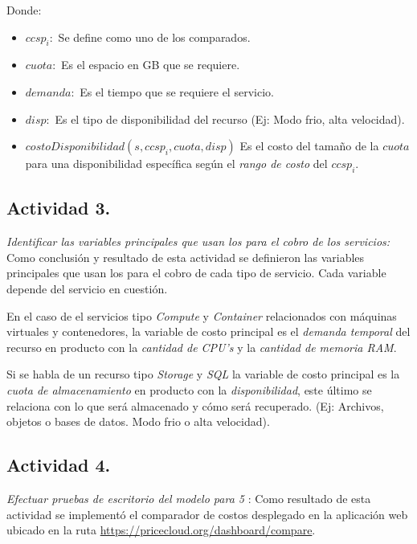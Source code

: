Donde:
\begin{itemize}
    \item $ccsp_i:$ Se define como uno de los  comparados.
    \item $cuota:$ Es el espacio en GB que se requiere.
    \item $demanda:$ Es el tiempo que se requiere el servicio.
    \item $disp:$ Es el tipo de disponibilidad del recurso (Ej: Modo frio, alta velocidad).
    \item $costoDisponibilidad(s,ccsp_i,cuota,disp)$ Es el costo del tamaño de la $cuota$ para una disponibilidad específica según el \emph{rango de costo} del $ccsp_i$.
\end{itemize}

\subsection{Actividad 3.}
\emph{Identificar las variables principales que usan los  para el cobro de los servicios:}
\newline\newline
Como conclusión y resultado de esta actividad se definieron las variables principales que usan los  para el cobro de cada tipo de servicio. Cada variable depende del servicio en cuestión.
\newline

En el caso de el servicios tipo \emph{Compute} y \emph{Container} relacionados con máquinas virtuales y contenedores, la variable de costo principal es el \emph{demanda temporal} del recurso en producto con la \emph{cantidad de CPU's} y la \emph{cantidad de memoria RAM}.
\newline

Si se habla de un recurso tipo \emph{Storage} y \emph{SQL} la variable de costo principal es la \emph{cuota de almacenamiento} en producto con la \emph{disponibilidad}, este último se relaciona con lo que será almacenado y cómo será recuperado. (Ej: Archivos, objetos o bases de datos. Modo frio o alta velocidad).
\newline

\subsection{Actividad 4.}
\emph{Efectuar pruebas de escritorio del modelo para 5 }:
\newline\newline
Como resultado de esta actividad se implementó el comparador de costos desplegado en la aplicación web ubicado en la ruta \url{https://pricecloud.org/dashboard/compare}.


